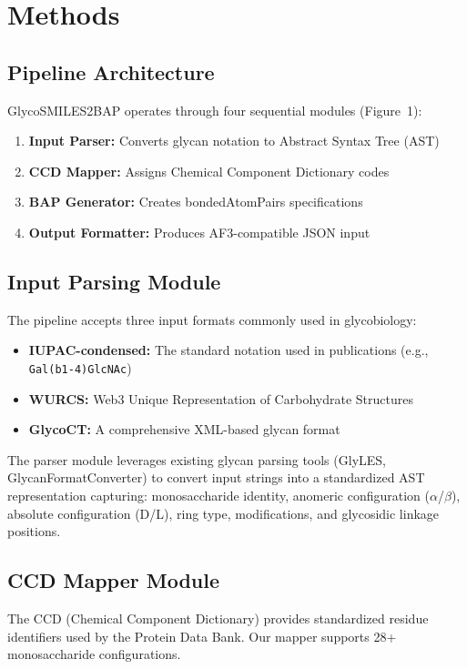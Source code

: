 \section{Methods}

\subsection{Pipeline Architecture}

GlycoSMILES2BAP operates through four sequential modules (Figure~1):
\begin{enumerate}
\item \textbf{Input Parser:} Converts glycan notation to Abstract Syntax Tree (AST)
\item \textbf{CCD Mapper:} Assigns Chemical Component Dictionary codes
\item \textbf{BAP Generator:} Creates bondedAtomPairs specifications
\item \textbf{Output Formatter:} Produces AF3-compatible JSON input
\end{enumerate}

\subsection{Input Parsing Module}

The pipeline accepts three input formats commonly used in glycobiology:
\begin{itemize}
\item \textbf{IUPAC-condensed:} The standard notation used in publications (e.g., \texttt{Gal(b1-4)GlcNAc})
\item \textbf{WURCS:} Web3 Unique Representation of Carbohydrate Structures
\item \textbf{GlycoCT:} A comprehensive XML-based glycan format
\end{itemize}

The parser module leverages existing glycan parsing tools (GlyLES, GlycanFormatConverter) to convert input strings into a standardized AST representation capturing: monosaccharide identity, anomeric configuration ($\alpha$/$\beta$), absolute configuration (D/L), ring type, modifications, and glycosidic linkage positions.

\subsection{CCD Mapper Module}

The CCD (Chemical Component Dictionary) provides standardized residue identifiers used by the Protein Data Bank. Our mapper supports 28+ monosaccharide configurations.

